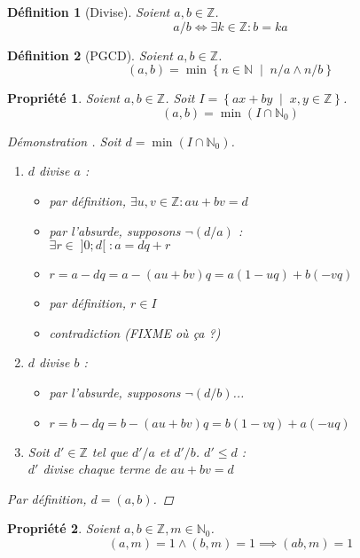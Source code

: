 \documentclass[11pt,twocolumn]{article}
\theoremstyle{plain}
\newtheorem{df}{Définition}
\newtheorem{pr}{Propriété}
\newcommand{\esN}{\mathbb{N}} %
\newcommand{\esZ}{\mathbb{Z}} %
\newcommand{\dbi}{\Longleftrightarrow}
\newenvironment{cproof}[1]{\begin{proof}[Démonstration \cite{#1}]}{\end{proof}}
\begin{document}
\begin{df}[Divise] Soient $a, b \in \esZ$. \[
	a/b \dbi \exists k \in \esZ : b = ka
\] \end{df}
\begin{df}[PGCD] Soient $a, b \in \esZ$. \[
	(a,b) = \min \left\{n \in \esN \; \middle| \; n/a \land n/b\right\}
\] \end{df}
\begin{pr}\label{pr:min}
	Soient $a, b \in \esZ$.
	Soit $I = \left\{ax + by \; \middle| \; x,y \in \esZ\right\}$. \[
		(a,b) = \min (I \cap \esN_0)
	\]
	\begin{cproof}{Buys}
		Soit $d = \min (I \cap \esN_0)$.
		\begin{enumerate}
			\item $d$ divise $a$ :
				\begin{itemize}
					\item par définition,
						$\exists u, v \in \esZ : au + bv = d$
					\item par l'absurde, supposons $\lnot(d/a)$ : \\
						$\exists r \in \; ]0;d[ \; : a = dq + r$
					\item $r=a-dq=a-(au+bv)q=a(1-uq)+b(-vq)$
					\item par définition, $r \in I$
					\item contradiction (FIXME où ça ?)
				\end{itemize}
			\item $d$ divise $b$ :
				\begin{itemize}
					\item par l'absurde, supposons $\lnot(d/b)$...
					\item $r=b-dq=b-(au+bv)q=b(1-vq)+a(-uq)$
				\end{itemize}
			\item Soit $d' \in \esZ$ tel que $d'/a$ et $d'/b$. $d' \leq d$ : \\
				$d'$ divise chaque terme de $au+bv=d$
		\end{enumerate}
		Par définition, $d=(a,b)$.
	\end{cproof}
\end{pr}
\begin{pr} Soient $a, b \in \esZ, m \in \esN_0$. \[
	(a, m) = 1 \land (b, m) = 1 \implies (ab, m) = 1
\] \end{pr}
\end{document}
